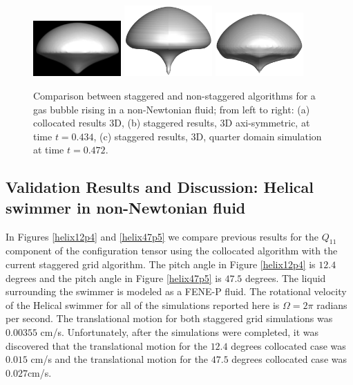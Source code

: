 \documentclass[]{article}
\begin{document}
\begin{figure}[htpb]
\centering
\includegraphics[width=0.3\textwidth]{collocated.png}
\includegraphics[width=0.3\textwidth]{staggared_rz_p434.png}
\includegraphics[width=0.3\textwidth]{staggared_qtr_p472.png}
\caption{Comparison between staggered and non-staggered algorithms for a
	gas bubble rising in a non-Newtonian fluid; from left to right:
	(a) collocated results 3D, (b) staggered results, 3D axi-symmetric,
	at time $t=0.434$, (c) staggered results, 3D, quarter domain simulation
	at time $t=0.472$. \label{gasbubblecompare} }
\end{figure}


\subsection{Validation Results and Discussion: 
 Helical swimmer in non-Newtonian fluid } 

In Figures \ref{helix12p4} and \ref{helix47p5} we compare previous 
results for the $Q_{11}$ component of the configuration tensor
using the collocated algorithm with the current staggered
grid algorithm.  The pitch angle in Figure \ref{helix12p4} is 
$12.4$ degrees and the pitch angle in Figure \ref{helix47p5} is
$47.5$ degrees.  The liquid surrounding the swimmer is modeled as a 
FENE-P fluid.  The rotational velocity of the Helical swimmer for 
all of the simulations reported here is 
$\Omega=2\pi$ radians per second. 
The translational motion for both staggered grid
simulations was $0.00355$ cm/s.  Unfortunately, after the simulations
were completed, it was discovered that the translational motion for the
$12.4$ degrees collocated case was $0.015$ cm/s and the translational
motion for the $47.5$ degrees collocated case was $0.027$cm/s.
\end{document}

